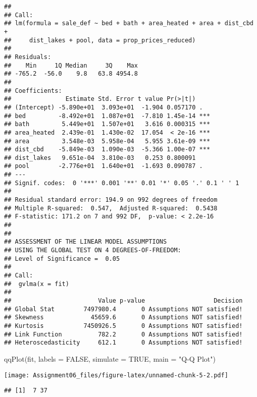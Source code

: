 \documentclass[
]{article}
\newenvironment{Shaded}{\begin{snugshade}}{\end{snugshade}}
\newcommand{\AttributeTok}[1]{\textcolor[rgb]{0.77,0.63,0.00}{#1}}
\newcommand{\ConstantTok}[1]{\textcolor[rgb]{0.00,0.00,0.00}{#1}}
\newcommand{\FunctionTok}[1]{\textcolor[rgb]{0.00,0.00,0.00}{#1}}
\newcommand{\NormalTok}[1]{#1}
\newcommand{\StringTok}[1]{\textcolor[rgb]{0.31,0.60,0.02}{#1}}
\begin{document}
\begin{verbatim}
## 
## Call:
## lm(formula = sale_def ~ bed + bath + area_heated + area + dist_cbd + 
##     dist_lakes + pool, data = prop_prices_reduced)
## 
## Residuals:
##    Min     1Q Median     3Q    Max 
## -765.2  -56.0    9.8   63.8 4954.8 
## 
## Coefficients:
##               Estimate Std. Error t value Pr(>|t|)    
## (Intercept) -5.890e+01  3.093e+01  -1.904 0.057170 .  
## bed         -8.492e+01  1.087e+01  -7.810 1.45e-14 ***
## bath         5.449e+01  1.507e+01   3.616 0.000315 ***
## area_heated  2.439e-01  1.430e-02  17.054  < 2e-16 ***
## area         3.548e-03  5.958e-04   5.955 3.61e-09 ***
## dist_cbd    -5.849e-03  1.090e-03  -5.366 1.00e-07 ***
## dist_lakes   9.651e-04  3.810e-03   0.253 0.800091    
## pool        -2.776e+01  1.640e+01  -1.693 0.090787 .  
## ---
## Signif. codes:  0 '***' 0.001 '**' 0.01 '*' 0.05 '.' 0.1 ' ' 1
## 
## Residual standard error: 194.9 on 992 degrees of freedom
## Multiple R-squared:  0.547,  Adjusted R-squared:  0.5438 
## F-statistic: 171.2 on 7 and 992 DF,  p-value: < 2.2e-16
## 
## 
## ASSESSMENT OF THE LINEAR MODEL ASSUMPTIONS
## USING THE GLOBAL TEST ON 4 DEGREES-OF-FREEDOM:
## Level of Significance =  0.05 
## 
## Call:
##  gvlma(x = fit) 
## 
##                        Value p-value                   Decision
## Global Stat        7497980.4       0 Assumptions NOT satisfied!
## Skewness             45659.6       0 Assumptions NOT satisfied!
## Kurtosis           7450926.5       0 Assumptions NOT satisfied!
## Link Function          782.2       0 Assumptions NOT satisfied!
## Heteroscedasticity     612.1       0 Assumptions NOT satisfied!
\end{verbatim}

\begin{Shaded}
\begin{Highlighting}[]
\FunctionTok{qqPlot}\NormalTok{(fit, }\AttributeTok{labels =} \ConstantTok{FALSE}\NormalTok{, }\AttributeTok{simulate =} \ConstantTok{TRUE}\NormalTok{, }\AttributeTok{main =} \StringTok{"Q{-}Q Plot"}\NormalTok{)}
\end{Highlighting}
\end{Shaded}

\texttt{[image: Assignment06\_files/figure-latex/unnamed-chunk-5-2.pdf]}

\begin{verbatim}
## [1]  7 37
\end{verbatim}
\end{document}
